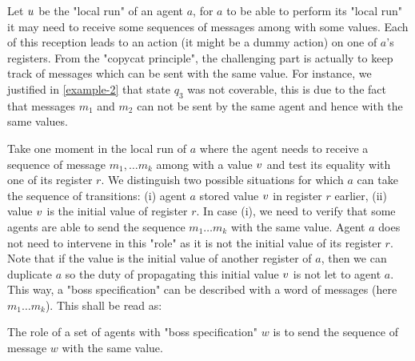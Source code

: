 Let $u$ be the "local run" of an agent $a$, for $a$ to be able to perform its "local run" it may need to receive some sequences of messages among with some values. Each of this reception leads to an action (it might be a dummy action) on one of $a$'s registers.
From the "copycat principle", the challenging part is actually to keep track of messages which can be sent with the same value. For instance, we justified in \cref{example-2} that state $q_3$ was not coverable, this is due to the fact that messages $m_1$ and $m_2$ can not be sent by the same agent and hence with the same values.

Take one moment in the local run of $a$ where the agent needs to receive a sequence of message $m_1, \dots m_k$ among with a value $v$ and test its equality with one of its register $r$. We distinguish two possible situations for which $a$ can take the sequence of transitions: (i) agent $a$ stored value $v$ in register $r$ earlier, (ii) value $v$ is the initial value of register $r$. In case (i), we need to verify that some agents are able to send the sequence $m_1 \dots m_k$ with the same value. Agent $a$ does not need to intervene in this "role" as it is not the initial value of its register $r$. Note that if the value is the initial value of another register of $a$, then we can duplicate $a$ so the duty of propagating this initial value $v$ is not let to agent $a$. This way, a "boss specification" can be described with a word of messages (here $m_1 \dots m_k$). This shall be read as:
\begin{center}
	The role of a set of agents with "boss specification" $w$ is to send the sequence of message $w$ with the same value.
\end{center}

